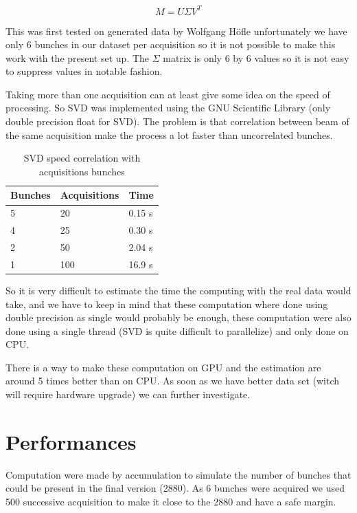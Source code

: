 $$M = U \Sigma V^{T}$$ 

This was first tested on generated data by Wolfgang H{\"o}fle\cite{HofleEvian10} unfortunately we have only 6 bunches in our dataset per acquisition so it is not possible to make this work with the present set up. The $\Sigma$ matrix is only 6 by 6 values so it is not easy to suppress values in notable fashion.

Taking more than one acquisition can at least give some idea on the speed of processing. So SVD was implemented using the GNU Scientific Library (only double precision float for SVD). The problem is that correlation between beam of the same acquisition make the process a lot faster than uncorrelated bunches.

\begin{table}[H]
	\caption{SVD speed correlation with acquisitions bunches}
	\label{tab:SVD}
	\centering
	\begin{tabular}{|l|l|l|}
		\hline
			Bunches & Acquisitions & Time \\
		\hline
			5 & 20 & 0.15 s \\
			4 & 25 & 0.30 s \\
			2 & 50 & 2.04 s \\
			1 & 100 & 16.9 s \\
		\hline
	\end{tabular}
\end{table}

So it is very difficult to estimate the time the computing with the real data would take, and we have to keep in mind that these computation where done using double precision as single would probably be enough, these computation were also done using a single thread (SVD is quite difficult to parallelize) and only done on \gls{CPU}.

There is a way to make these computation on \gls{GPU}\cite{Lahabar09} and the estimation are around 5 times better than on \gls{CPU}. As soon as we have better data set (witch will require hardware upgrade) we can further investigate.

\section{Performances}
\label{sec:perf}

Computation were made by accumulation to simulate the number of bunches that could be present in the final version (2880). As 6 bunches were acquired we used 500 successive acquisition to make it close to the 2880 and have a safe margin.

